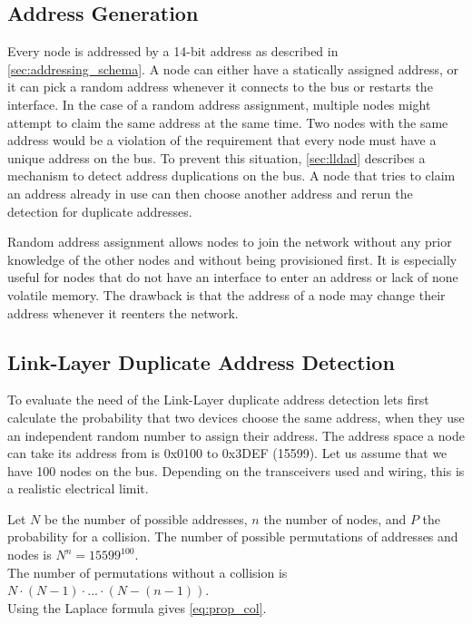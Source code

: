 \subsection{Address Generation}
\label{sec:address_generation}

Every node is addressed by a 14-bit address as described in \autoref{sec:addressing_schema}.
A node can either have a statically assigned address, or it can pick a random address whenever it connects to the bus or restarts the interface.
In the case of a random address assignment, multiple nodes might attempt to claim the same address at the same time.
Two nodes with the same address would be a violation of the requirement that every node must have a unique address on the bus.
To prevent this situation, \autoref{sec:lldad} describes a mechanism to detect address duplications on the bus.
A node that tries to claim an address already in use can then choose another address and rerun the detection for duplicate addresses.

Random address assignment allows nodes to join the network without any prior knowledge of the other nodes and without being provisioned first.
It is especially useful for nodes that do not have an interface to enter an address or lack of none volatile memory.
The drawback is that the address of a node may change their address whenever it reenters the network.

\subsection{Link-Layer Duplicate Address Detection}
\label{sec:lldad}

To evaluate the need of the Link-Layer duplicate address detection lets first calculate the probability that two devices choose the same address,
when they use an independent random number to assign their address.
The address space a node can take its address from is 0x0100 to 0x3DEF (15599).
Let us assume that we have 100 nodes on the bus.
Depending on the transceivers used and wiring, this is a realistic electrical limit.

Let $N$ be the number of possible addresses, $n$ the number of nodes, and $P$ the probability for a collision. 
The number of possible permutations of addresses and nodes is $N^n = 15599^{100}$.\\
The number of permutations without a collision is \\ $N \cdot (N-1) \cdot ... \cdot (N - (n - 1))$.\\
Using the Laplace formula gives \autoref{eq:prop_col}.

